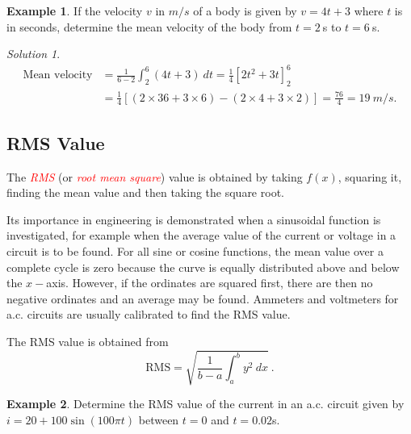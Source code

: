 \documentclass[
  11pt,
  oneside]{book}
\newcommand{\slide}{}
\theoremstyle{definition}
\theoremstyle{definition}
\newtheorem{example}{Example}[chapter]
\theoremstyle{definition}
\theoremstyle{definition}
\theoremstyle{remark}
\newtheorem*{solution}{Solution}
\begin{document}
\slide

\begin{example}
If the velocity \(v\) in \(m/s\) of a body is given by \(v=4t+3\) where \(t\) is in seconds, determine the mean velocity of the body from \(t=2\ \)s to \(t=6\ \)s.
\end{example}

\begin{solution}
\begin{align*}
\text{Mean velocity}& = \frac{1}{6-2}\int_2^6(4t+3)\ dt = \frac 14\left[2t^2+3t\right]_2^6\\
&= \frac 14\left[(2\times36+3\times6) -(2\times4+3\times2)\right] = \frac{76}{4}=19\ m/s.
\end{align*}
\end{solution}

\slide

\subsection{RMS Value}\label{rms-value}

The \textcolor{red}{\em RMS} (or \textcolor{red}{\em root mean square}) value is obtained by taking \(f(x)\), squaring it, finding the mean value and then taking the square root.

Its importance in engineering is demonstrated when a sinusoidal function is investigated, for example when the average value of the current or voltage in a circuit is to be found. For all sine or cosine functions, the mean value over a complete cycle is zero because the curve is equally distributed above and below the \(x-\)axis. However, if the ordinates are squared first, there are then no negative ordinates and an average may be found. Ammeters and voltmeters for a.c. circuits are usually calibrated to find the RMS value.

The RMS value is obtained from
\[
\text{RMS} = \sqrt{\frac{1}{b-a}\int_a^b y^2\ dx}\ .
\]
\slide

\begin{example}
Determine the RMS value of the current in an a.c. circuit given by \(i=20+100\sin(100\pi t)\) between \(t=0\) and \(t=0.02\)s.
\end{example}
\end{document}
